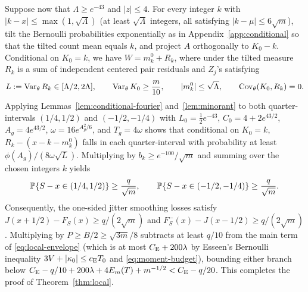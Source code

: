Suppose now that $\Lambda\ge e^{-43}$ and $|z|\le4$. For every integer $k$
with $|k-x|\le\max(1,\sqrt\Lambda)$ (at least $\sqrt\Lambda$ integers, all
satisfying $|k-\mu|\le6\sqrt m$), tilt the Bernoulli probabilities
exponentially as in Appendix~\ref{app:conditional} so that the tilted count
mean equals $k$, and project $A$ orthogonally to $K_0-k$. Conditional on
$K_0=k$, we have $W=m_k^0+R_k$, where under the tilted measure $R_k$ is a sum
of independent centered pair residuals and $Z_j$'s satisfying
\begin{equation}\label{eq:tilted-residual}
 L:=\operatorname{Var}_\theta R_k\in[\Lambda/2,2\Lambda],\qquad
 \operatorname{Var}_\theta K_0\ge \frac m{10},\qquad |m_k^0|\le\sqrt\Lambda,
 \qquad\operatorname{Cov}_\theta(K_0,R_k)=0.
\end{equation}
Applying Lemmas~\ref{lem:conditional-fourier} and~\ref{lem:minorant} to both
quarter-intervals $(1/4,1/2)$ and $(-1/2,-1/4)$ with $L_0=\frac12e^{-43}$,
$C_0=4+2e^{43/2}$, $A_g=4e^{43/2}$, $\omega=16e^{A_g^2/6}$, and $T_g=4\omega$
shows that conditional on $K_0=k$, $R_k-(x-k-m_k^0)$ falls in each
quarter-interval with probability at least $\phi(A_g)/(8\omega\sqrt L)$.
Multiplying by $b_k\ge e^{-100}/\sqrt m$ and summing over the chosen integers
$k$ yields
\begin{equation}\label{eq:quarter-mass}
 \mathbb P\{S-x\in(1/4,1/2)\}\ge \frac q{\sqrt m},\qquad
 \mathbb P\{S-x\in(-1/2,-1/4)\}\ge \frac q{\sqrt m}.
\end{equation}
Consequently, the one-sided jitter smoothing losses satisfy
$J(x+1/2)-F_S(x)\ge q/(2\sqrt m)$ and $F_S^-(x)-J(x-1/2)\ge q/(2\sqrt m)$.
Multiplying by $P\ge B/2\ge\sqrt{3m}/8$ subtracts at least $q/10$ from the
main term of \eqref{eq:local-envelope} (which is at most $C_{\mathrm E}+200\lambda$ by
Esseen's Bernoulli inequality $3V+|\kappa_0|\le c_{\mathrm E} T_0$ and
\eqref{eq:moment-budget}), bounding either branch below
$C_{\mathrm E}-q/10+200\lambda+4E_m(T)+m^{-1/2}<C_{\mathrm E}-q/20$. This completes the proof of
Theorem~\ref{thm:local}.
